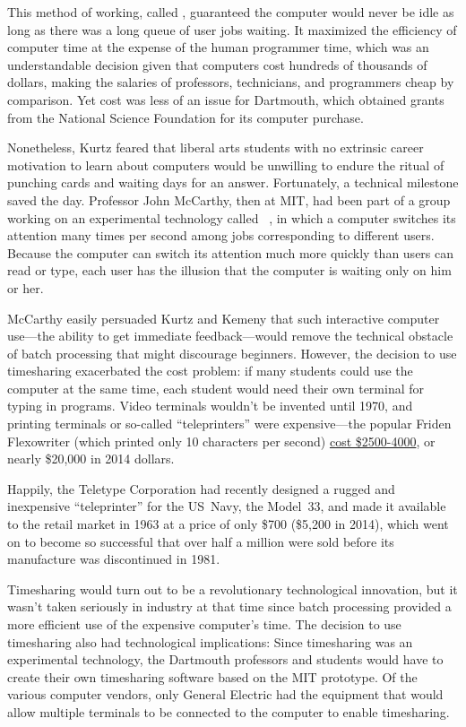 This method of working, called , guaranteed the
computer would never be idle as long as there was a long queue of user
jobs waiting.
It maximized the efficiency of computer time at the expense 
of the human programmer time, which was an understandable
decision given that computers cost hundreds of thousands of dollars,
making the salaries of professors, technicians, and programmers cheap
by comparison.
Yet cost was less of an issue for Dartmouth, which obtained
grants from the National Science Foundation for  its computer
purchase. 

Nonetheless, Kurtz feared that liberal arts students with no
extrinsic career motivation to learn about computers would be unwilling
to endure the ritual of
punching cards and waiting days for an answer.
Fortunately, a technical milestone saved the day.
Professor John McCarthy, then at MIT, had been part of a group working
on an experimental technology called
~\cite{corbato62timesharing}, in which a computer
switches its attention many times per second among jobs corresponding to
different users.
Because the computer can switch its attention much more quickly than
users can read or type, each user has the illusion that the computer
is waiting only on him or her.


McCarthy easily persuaded Kurtz and Kemeny that such interactive
computer use---the ability to get 
immediate feedback---would remove the technical obstacle of batch
processing that might discourage beginners.
However, the decision to use timesharing exacerbated the cost problem:
if many students could use the computer at the same time, each student
would need their own terminal for typing in programs.
Video terminals wouldn't be invented until 1970, and printing terminals
or so-called ``teleprinters'' were expensive---the popular
Friden Flexowriter (which printed only 10 characters per second)
\href{http://retrotechnology.com/herbs_stuff/flex_behr.html}{cost
  \$2500-4000}, or nearly \$20,000 in 2014 dollars.

Happily, the Teletype Corporation had recently designed a rugged and
inexpensive ``teleprinter'' for the US~Navy, the Model~33, and made it
available to the retail market in 1963 at a price of only \$700 (\$5,200
in 2014), which went on to become so successful that over
half a million were sold before its manufacture was
discontinued in 1981.

Timesharing would turn out to be a revolutionary technological innovation,
but it wasn't taken seriously in industry at that time since batch
processing provided a more efficient use of the expensive computer's
time.  
The decision to use timesharing also had technological implications:
Since timesharing was an experimental technology, the Dartmouth
professors and students would have to create their own
timesharing software based on the MIT prototype.  Of the various
computer vendors, only General Electric had the equipment that would
allow multiple terminals to be connected to the computer to enable
timesharing. 

